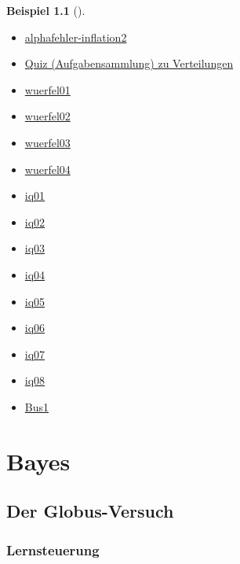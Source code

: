 \documentclass[
  ngerman,
  letterpaper,
  twoside,
  open=any]{scrbook}
\providecommand{\tightlist}{%
  \setlength{\itemsep}{0pt}\setlength{\parskip}{0pt}}\usepackage{longtable,booktabs,array}
\theoremstyle{definition}
\newtheorem{example}{Beispiel}[chapter]
\theoremstyle{plain}
\theoremstyle{definition}
\theoremstyle{definition}
\theoremstyle{remark}
\begin{document}
\begin{example}[]
\begin{itemize}
\tightlist
\item
  \href{https://datenwerk.netlify.app/posts/alphafehler-inflation2/alphafehler-inflation2.html}{alphafehler-inflation2}
\item
  \href{https://datenwerk.netlify.app/\#category=Verteilungen-Quiz}{Quiz
  (Aufgabensammlung) zu Verteilungen}
\item
  \href{https://datenwerk.netlify.app/posts/wuerfel01/wuerfel01.html}{wuerfel01}
\item
  \href{https://datenwerk.netlify.app/posts/wuerfel02/wuerfel02.html}{wuerfel02}
\item
  \href{https://datenwerk.netlify.app/posts/wuerfel03/wuerfel03.html}{wuerfel03}
\item
  \href{https://datenwerk.netlify.app/posts/wuerfel04/wuerfel04.html}{wuerfel04}
\item
  \href{https://datenwerk.netlify.app/posts/iq01/iq01}{iq01}
\item
  \href{https://datenwerk.netlify.app/posts/iq02/iq02}{iq02}
\item
  \href{https://datenwerk.netlify.app/posts/iq03/iq03}{iq03}
\item
  \href{https://datenwerk.netlify.app/posts/iq04/iq04}{iq04}
\item
  \href{https://datenwerk.netlify.app/posts/iq05/iq05}{iq05}
\item
  \href{https://datenwerk.netlify.app/posts/iq06/iq06}{iq06}
\item
  \href{https://datenwerk.netlify.app/posts/iq07/iq07}{iq07}
\item
  \href{https://datenwerk.netlify.app/posts/iq08/iq08}{iq08}
\item
  \href{https://datenwerk.netlify.app/posts/bus1/bus1}{Bus1}
\end{itemize}

\part{Bayes}

\chapter{Der Globus-Versuch}\label{der-globus-versuch}

\section{Lernsteuerung}\label{lernsteuerung-5}


\end{example}
\end{document}
